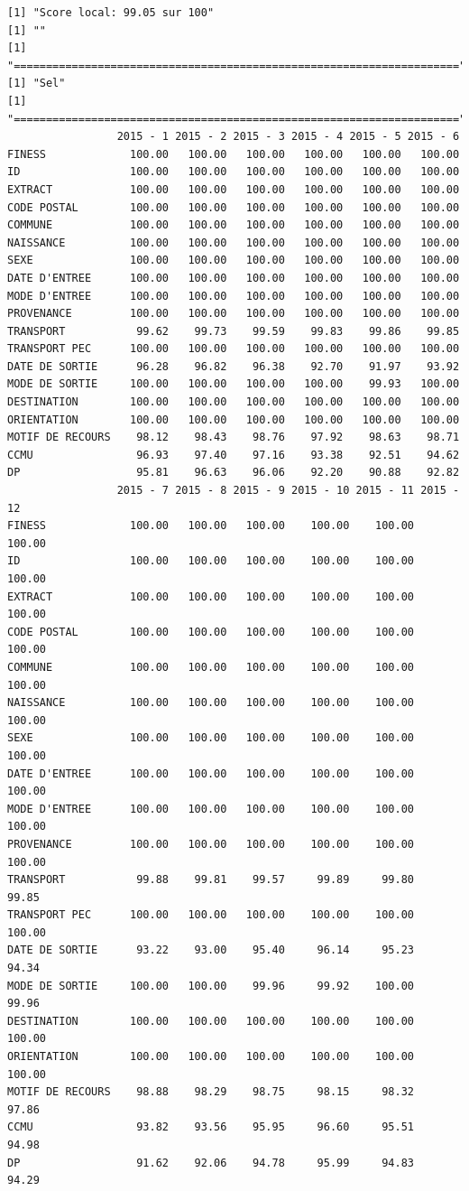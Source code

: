 \documentclass[]{article}
\begin{document}
\begin{verbatim}
[1] "Score local: 99.05 sur 100"
[1] ""
[1] "====================================================================="
[1] "Sel"
[1] "====================================================================="
                 2015 - 1 2015 - 2 2015 - 3 2015 - 4 2015 - 5 2015 - 6
FINESS             100.00   100.00   100.00   100.00   100.00   100.00
ID                 100.00   100.00   100.00   100.00   100.00   100.00
EXTRACT            100.00   100.00   100.00   100.00   100.00   100.00
CODE POSTAL        100.00   100.00   100.00   100.00   100.00   100.00
COMMUNE            100.00   100.00   100.00   100.00   100.00   100.00
NAISSANCE          100.00   100.00   100.00   100.00   100.00   100.00
SEXE               100.00   100.00   100.00   100.00   100.00   100.00
DATE D'ENTREE      100.00   100.00   100.00   100.00   100.00   100.00
MODE D'ENTREE      100.00   100.00   100.00   100.00   100.00   100.00
PROVENANCE         100.00   100.00   100.00   100.00   100.00   100.00
TRANSPORT           99.62    99.73    99.59    99.83    99.86    99.85
TRANSPORT PEC      100.00   100.00   100.00   100.00   100.00   100.00
DATE DE SORTIE      96.28    96.82    96.38    92.70    91.97    93.92
MODE DE SORTIE     100.00   100.00   100.00   100.00    99.93   100.00
DESTINATION        100.00   100.00   100.00   100.00   100.00   100.00
ORIENTATION        100.00   100.00   100.00   100.00   100.00   100.00
MOTIF DE RECOURS    98.12    98.43    98.76    97.92    98.63    98.71
CCMU                96.93    97.40    97.16    93.38    92.51    94.62
DP                  95.81    96.63    96.06    92.20    90.88    92.82
                 2015 - 7 2015 - 8 2015 - 9 2015 - 10 2015 - 11 2015 - 12
FINESS             100.00   100.00   100.00    100.00    100.00    100.00
ID                 100.00   100.00   100.00    100.00    100.00    100.00
EXTRACT            100.00   100.00   100.00    100.00    100.00    100.00
CODE POSTAL        100.00   100.00   100.00    100.00    100.00    100.00
COMMUNE            100.00   100.00   100.00    100.00    100.00    100.00
NAISSANCE          100.00   100.00   100.00    100.00    100.00    100.00
SEXE               100.00   100.00   100.00    100.00    100.00    100.00
DATE D'ENTREE      100.00   100.00   100.00    100.00    100.00    100.00
MODE D'ENTREE      100.00   100.00   100.00    100.00    100.00    100.00
PROVENANCE         100.00   100.00   100.00    100.00    100.00    100.00
TRANSPORT           99.88    99.81    99.57     99.89     99.80     99.85
TRANSPORT PEC      100.00   100.00   100.00    100.00    100.00    100.00
DATE DE SORTIE      93.22    93.00    95.40     96.14     95.23     94.34
MODE DE SORTIE     100.00   100.00    99.96     99.92    100.00     99.96
DESTINATION        100.00   100.00   100.00    100.00    100.00    100.00
ORIENTATION        100.00   100.00   100.00    100.00    100.00    100.00
MOTIF DE RECOURS    98.88    98.29    98.75     98.15     98.32     97.86
CCMU                93.82    93.56    95.95     96.60     95.51     94.98
DP                  91.62    92.06    94.78     95.99     94.83     94.29
\end{verbatim}
\end{document}
